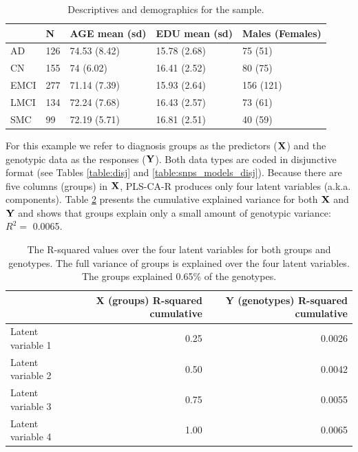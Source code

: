 \documentclass[12pt]{article}
\begin{document}
\begin{table}[!h]

\caption{\label{tab:sample_descriptives}\label{table:desctab} Descriptives and demographics for the sample.}
\centering
\begin{tabular}{lllll}
\toprule
  & N & AGE mean (sd) & EDU mean (sd) & Males (Females)\\
\midrule
AD & 126 & 74.53 (8.42) & 15.78 (2.68) & 75 (51)\\
CN & 155 & 74 (6.02) & 16.41 (2.52) & 80 (75)\\
EMCI & 277 & 71.14 (7.39) & 15.93 (2.64) & 156 (121)\\
LMCI & 134 & 72.24 (7.68) & 16.43 (2.57) & 73 (61)\\
SMC & 99 & 72.19 (5.71) & 16.81 (2.51) & 40 (59)\\
\bottomrule
\end{tabular}
\end{table}

For this example we refer to diagnosis groups as the predictors
(\({\bf X}\)) and the genotypic data as the responses (\({\bf Y}\)).
Both data types are coded in disjunctive format (see Tables
\ref{table:disj} and \ref{table:snps_models_disj}). Because there are
five columns (groups) in \({\bf X}\), PLS-CA-R produces only four latent
variables (a.k.a. components). Table \ref{table:r2ex1} presents the
cumulative explained variance for both \({\bf X}\) and \({\bf Y}\) and
shows that groups explain only a small amount of genotypic variance:
\(R^2=\) 0.0065.

\begin{table}[!h]

\caption{\label{tab:unnamed-chunk-3}\label{table:r2ex1} The R-squared values over the four latent variables for both groups and genotypes. The full variance of groups is explained over the four latent variables. The groups explained 0.65\% of the genotypes.}
\centering
\begin{tabular}{lrr}
\toprule
  & X (groups) R-squared cumulative & Y (genotypes) R-squared cumulative\\
\midrule
Latent variable 1 & 0.25 & 0.0026\\
Latent variable 2 & 0.50 & 0.0042\\
Latent variable 3 & 0.75 & 0.0055\\
Latent variable 4 & 1.00 & 0.0065\\
\bottomrule
\end{tabular}
\end{table}
\end{document}
